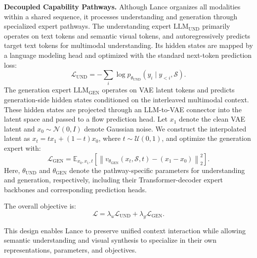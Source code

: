 \textbf{Decoupled Capability Pathways.}
Although Lance organizes all modalities within a shared sequence, it processes understanding and generation through specialized expert pathways. The understanding expert $\mathrm{LLM}_{\mathrm{UND}}$ primarily operates on text tokens and semantic visual tokens, and autoregressively predicts target text tokens for multimodal understanding. Its hidden states are mapped by a language modeling head and optimized with the standard next-token prediction loss:
\begin{equation}
\mathcal{L}_{\mathrm{UND}}
= - \sum_i \log p_{\theta_{\mathrm{UND}}}(y_i \mid y_{<i}, \mathcal{S}).
\end{equation}
The generation expert $\mathrm{LLM}_{\mathrm{GEN}}$ operates on VAE latent tokens and predicts generation-side hidden states conditioned on the interleaved multimodal context. These hidden states are projected through an LLM-to-VAE connector into the latent space and passed to a flow prediction head. Let $x_1$ denote the clean VAE latent and $x_0 \sim \mathcal{N}(0, I)$ denote Gaussian noise. We construct the interpolated latent as $x_t = t x_1 + (1-t)x_0$, where $t \sim \mathcal{U}(0,1)$, and optimize the generation expert with:
\begin{equation}
\mathcal{L}_{\mathrm{GEN}} =
\mathbb{E}_{x_0, x_1, t}
\left[
\left\|
v_{\theta_{\mathrm{GEN}}}(x_t, \mathcal{S}, t) - (x_1 - x_0)
\right\|_2^2
\right].
\end{equation}
Here, $\theta_{\mathrm{UND}}$ and $\theta_{\mathrm{GEN}}$ denote the pathway-specific parameters for understanding and generation, respectively, including their Transformer-decoder expert backbones and corresponding prediction heads.

The overall objective is:
\begin{equation}
\mathcal{L}
= \lambda_u \mathcal{L}_{\mathrm{UND}}
+ \lambda_g \mathcal{L}_{\mathrm{GEN}}.
\end{equation}

This design enables Lance to preserve unified context interaction while allowing semantic understanding and visual synthesis to specialize in their own representations, parameters, and objectives.




